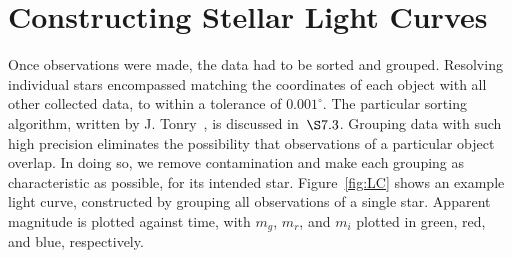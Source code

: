 \documentclass[aps,prb,twocolumn,superscriptaddress]{revtex4-1}
\begin{document}

\section{Constructing Stellar Light Curves}

Once observations were made, the data had to be sorted and grouped.  Resolving individual stars encompassed 
matching the coordinates of each object with all other collected data, to within a tolerance of $0.001^{\circ}$.  
The particular sorting algorithm, written by J. Tonry~\cite{gri}, is discussed in~$\S 7.3$.  %
Grouping data 
with such high precision eliminates the possibility that observations of a particular object overlap.  
In doing so, we remove contamination and make each grouping as characteristic as possible, for its intended star.  
Figure~\ref{fig:LC} shows an example light curve, constructed by grouping all observations of a single star.  
Apparent magnitude is plotted against time, with $m_{g}$, $m_{r}$, and $m_{i}$ plotted in green, red, and blue, respectively.

\end{document}
